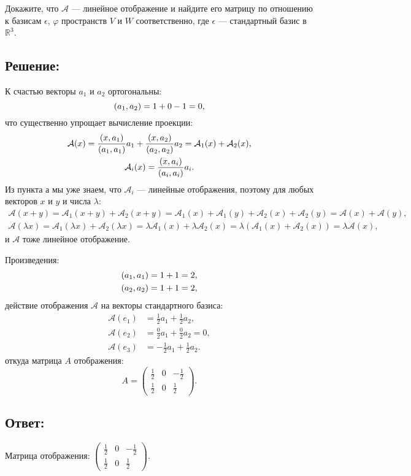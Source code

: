 \documentclass[12pt]{article}
\begin{document}
    Докажите, что $\mathcal{A}$ --- линейное отображение и найдите его матрицу по отношению к базисам $\epsilon$, $\varphi$ пространств $V$ и $W$ соответственно, где $\epsilon$ ---
    стандартный базис в $\mathbb{R}^3$.

    \subsection*{Решение:}
    К счастью векторы $a_1$ и $a_2$ ортогональны:
    \[
        \left ( a_1, a_2 \right ) = 1 + 0 - 1 = 0,
    \]
    что существенно упрощает вычисление проекции:
    \begin{gather*}
        \mathcal{A}(x)
        = \frac{\left ( x, a_1 \right )}{\left ( a_1, a_1 \right )} a_1 + \frac{\left ( x, a_2 \right )}{\left ( a_2, a_2 \right )} a_2
        = \mathcal{A}_1(x) + \mathcal{A}_2(x) , \\
        \mathcal{A}_i(x) = \frac{\left ( x, a_i \right )}{\left ( a_i, a_i \right )} a_i .
    \end{gather*}
    Из пункта а мы уже знаем, что $\mathcal{A}_i$ --- линейные отображения, поэтому для любых векторов $x$ и $y$ и числа $\lambda$:
    \begin{gather*}
        \mathcal{A}(x + y)
        = \mathcal{A}_1(x + y) + \mathcal{A}_2(x + y)
        = \mathcal{A}_1(x) + \mathcal{A}_1(y) + \mathcal{A}_2(x) + \mathcal{A}_2(y)
        = \mathcal{A}(x) + \mathcal{A}(y), \\
        \mathcal{A}(\lambda x)
        = \mathcal{A}_1(\lambda x) + \mathcal{A}_2(\lambda x)
        = \lambda \mathcal{A}_1(x) + \lambda \mathcal{A}_2(x)
        = \lambda \left ( \mathcal{A}_1(x) + \mathcal{A}_2(x) \right )
        = \lambda \mathcal{A}(x),
    \end{gather*}
    и $\mathcal{A}$ тоже линейное отображение.

    Произведения:
    \begin{gather*}
        \left ( a_1, a_1 \right ) = 1 + 1 = 2, \\
        \left ( a_2, a_2 \right ) = 1 + 1 = 2 ,
    \end{gather*}
    действие отображения $\mathcal{A}$ на векторы стандартного базиса:
    \begin{align*}
        \mathcal{A}(e_1) & = \frac{1}{2} a_1 + \frac{1}{2} a_2 , \\
        \mathcal{A}(e_2) & = \frac{0}{2} a_1 + \frac{0}{2} a_2  = 0 , \\
        \mathcal{A}(e_3) & = -\frac{1}{2} a_1 + \frac{1}{2} a_2 .
    \end{align*}
    откуда матрица $A$ отображения:
    \[
        A
        =
        \begin{pmatrix}
            \frac{1}{2} & 0 & - \frac{1}{2} \\
            \frac{1}{2} & 0 & \frac{1}{2}
        \end{pmatrix}
        .
    \]

    \subsection*{Ответ:}
    Матрица отображения:
    $
    \begin{pmatrix}
        \frac{1}{2} & 0 & - \frac{1}{2} \\
        \frac{1}{2} & 0 & \frac{1}{2}
    \end{pmatrix}
    $.
\end{document}
